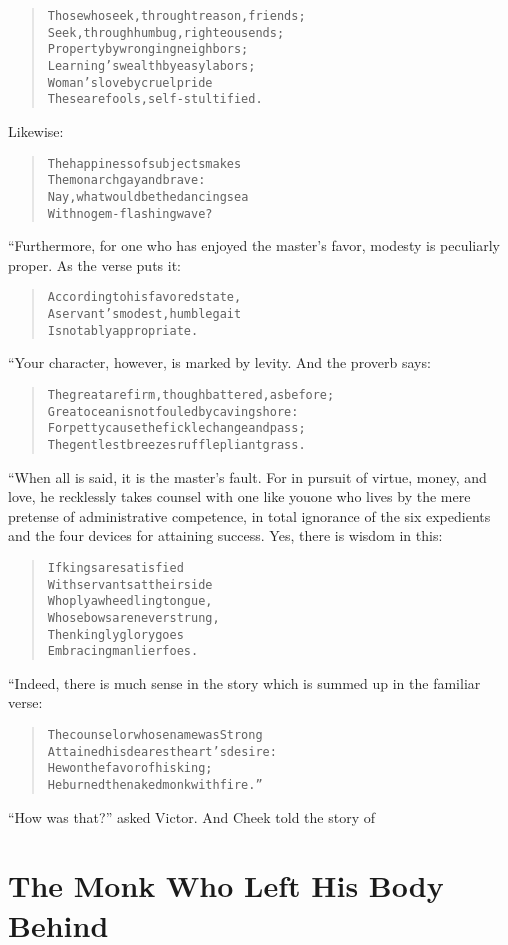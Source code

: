\documentclass[article, twoside, 14pt]{memoir}
\renewenvironment{verbatim}{%
\begin{quote}%
\vskip -10pt%
\begin{alltt}\normalfont\large}{\end{alltt}%
\end{quote}%
\vskip -10pt
} %
\begin{document}
\begin{verbatim}
Those who seek, through treason, friends;
Seek, through humbug, righteous ends;
Property by wronging neighbors;
Learning's wealth by easy labors;
Woman's love by cruel pride{\textemdash}
These are fools, self-stultified.
\end{verbatim}
Likewise:

\begin{verbatim}
The happiness of subjects makes
    The monarch gay and brave:
Nay, what would be the dancing sea
    With no gem-flashing wave?
\end{verbatim}
“Furthermore, for one who has enjoyed the master's favor, modesty
is peculiarly proper. As the verse puts it:

\begin{verbatim}
According to his favored state,
A servant's modest, humble gait
Is notably appropriate.
\end{verbatim}
“Your character, however, is marked by levity. And the proverb
says:

\begin{verbatim}
The great are firm, though battered, as before;
Great ocean is not fouled by caving shore:
For petty cause the fickle change and pass;
The gentlest breezes ruffle pliant grass.
\end{verbatim}
“When all is said, it is the master's fault. For in pursuit of
virtue, money, and love, he recklessly takes counsel with one like
you{\textemdash}one who lives by the mere pretense of administrative
competence, in total ignorance of the six expedients and the four
devices for attaining success. Yes, there is wisdom in this:

\begin{verbatim}
If kings are satisfied
With servants at their side
Who ply a wheedling tongue,
Whose bows are never strung,
Then kingly glory goes
Embracing manlier foes.
\end{verbatim}
“Indeed, there is much sense in the story which is summed up in the
familiar verse:

\begin{verbatim}
The counselor whose name was Strong
    Attained his dearest heart's desire:
He won the favor of his king;
    He burned the naked monk with fire.”
\end{verbatim}
``How was that?'' asked Victor. And Cheek told the story of

\chapter{The Monk Who Left His Body Behind}
\end{document}
